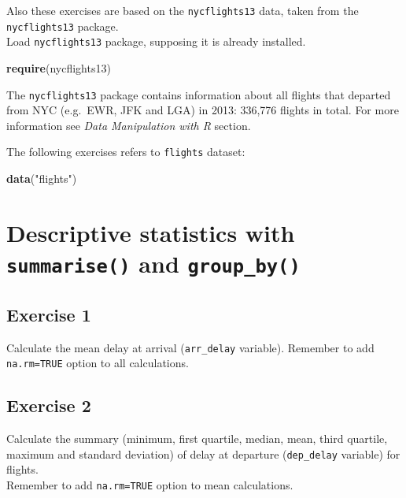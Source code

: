\documentclass[]{book}
\newenvironment{Shaded}{\begin{snugshade}}{\end{snugshade}}
\newcommand{\KeywordTok}[1]{\textcolor[rgb]{0.13,0.29,0.53}{\textbf{{#1}}}}
\newcommand{\StringTok}[1]{\textcolor[rgb]{0.31,0.60,0.02}{{#1}}}
\newcommand{\NormalTok}[1]{{#1}}
\begin{document}
Also these exercises are based on the \texttt{nycflights13} data, taken
from the \texttt{nycflights13} package.\\
Load \texttt{nycflights13} package, supposing it is already installed.

\begin{Shaded}
\begin{Highlighting}[]
\KeywordTok{require}\NormalTok{(nycflights13)}
\end{Highlighting}
\end{Shaded}

The \texttt{nycflights13} package contains information about all flights
that departed from NYC (e.g.~EWR, JFK and LGA) in 2013: 336,776 flights
in total. For more information see \emph{Data Manipulation with R}
section.

The following exercises refers to \texttt{flights} dataset:

\begin{Shaded}
\begin{Highlighting}[]
\KeywordTok{data}\NormalTok{(}\StringTok{"flights"}\NormalTok{)}
\end{Highlighting}
\end{Shaded}

\section{\texorpdfstring{Descriptive statistics with
\texttt{summarise()} and
\texttt{group\_by()}}{Descriptive statistics with summarise() and group\_by()}}\label{descriptive-statistics-with-summarise-and-group_by}

\subsection{Exercise 1}\label{exercise-1-11}

Calculate the mean delay at arrival (\texttt{arr\_delay} variable).
Remember to add \texttt{na.rm=TRUE} option to all calculations.

\subsection{Exercise 2}\label{exercise-2-6}

Calculate the summary (minimum, first quartile, median, mean, third
quartile, maximum and standard deviation) of delay at departure
(\texttt{dep\_delay} variable) for flights.\\
Remember to add \texttt{na.rm=TRUE} option to mean calculations.
\end{document}
